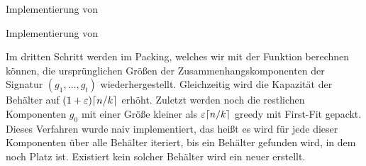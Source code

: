 \begin{algorithm}
    \caption{Implementierung von }
    \label{alg:pape}
    \begin{algorithmic}
                 
                    \EndIf
                \EndFor
                \EndFor
            \EndFor
        \EndFunction
    \end{algorithmic}
\end{algorithm}

\begin{algorithm}
    \caption{Implementierung von }
    \label{alg:bapa}
    \begin{algorithmic}
             
                 
            \EndFor
        \EndFunction
    \end{algorithmic}
\end{algorithm}

 Im dritten Schritt werden im Packing, welches wir mit der Funktion  berechnen können, die ursprünglichen Größen der Zusammenhangskomponenten der Signatur $(g_1, \ldots, g_t)$ wiederhergestellt. 
Gleichzeitig wird die Kapazität der Behälter auf $(1+\varepsilon)\lceil n/k\rceil$ erhöht.
Zuletzt werden noch die restlichen Komponenten $g_0$ mit einer Größe kleiner als $\varepsilon \lceil n/k\rceil$ greedy mit First-Fit gepackt.
 Dieses Verfahren wurde naiv implementiert, das heißt es wird für jede dieser Komponenten über alle Behälter iteriert, bis ein Behälter gefunden wird, in dem noch Platz ist.
Existiert kein solcher Behälter wird ein neuer erstellt.

